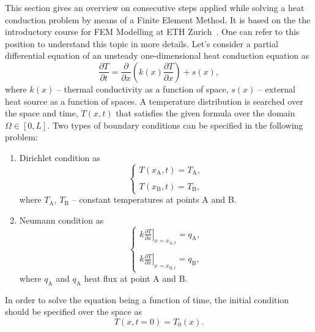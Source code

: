 This section gives an overview on consecutive steps applied while solving a heat conduction problem by means of a Finite Element Method. It is based on the the introductory course for FEM Modelling at ETH Zurich~\cite{eth_introduction_to_finite_element}. One can refer to this position to understand this topic in more details. Let's consider a partial differential equation of an unsteady one-dimensional heat conduction equation as 
\begin{equation}
    \frac{\partial T}{\partial t} = \frac{\partial}{\partial x} \left(k(x) \frac{\partial T}{\partial x} \right) + s(x), 
    \label{eqn:heat_conduction_pde}
\end{equation}
where $k(x)$ -- thermal conductivity as a function of space, $s(x)$ -- external heat source as a function of spaces. A temperature distribution is searched over the space and time, $T(x, t)$ that satisfies the given formula over the domain $\Omega \in \left[ 0, L \right]$. Two types of boundary conditions can be specified in the following problem: 
\begin{enumerate}
    \item 
    Dirichlet condition as \begin{equation}
    \left\{ \begin{array}{ lll }
    T(x_\text{A}, t) = T_\text{A},  \\ \\
    T(x_\text{B}, t) = T_\text{B},
    \end{array} \right.
    \end{equation}
    where $T_\text{A}$, $T_\text{B}$ -- constant temperatures at points A and B.
    
    \item Neumann condition as 
    \begin{equation}
    \left\{ \begin{array}{ lll }
    \left. k \frac{\partial T}{\partial x} \right|_{x=x_{\text{A},t}} = q_\text{A}, \\ \\
    \left. k \frac{\partial T}{\partial x} \right|_{x=x_{\text{B},t}} = q_\text{B},
    \end{array} \right.
    \label{eqn:neumann_bcs}
    \end{equation}
    where $q_\text{A}$ and $q_\text{A}$ heat flux at point A and B.
\end{enumerate}

In order to solve the equation being a function of time, the initial condition should be specified over the space as 
\begin{equation}
    T(x, t=0) = T_0(x).
\end{equation}

